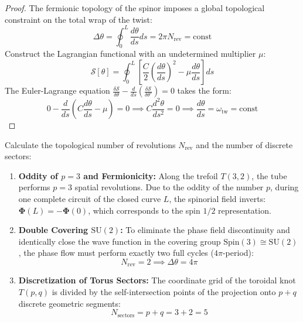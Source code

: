 \documentclass[12pt,a4paper]{article}
\begin{document}
	\begin{proof}
		The fermionic topology of the spinor imposes a global topological constraint on the total wrap of the twist:
		\begin{equation}
			\Delta \theta = \oint_0^L \frac{d\theta}{ds} ds = 2\pi N_{\text{rev}} = \text{const}
		\end{equation}
		Construct the Lagrangian functional with an undetermined multiplier $\mu$:
		\begin{equation}
			\mathcal{S}[\theta] = \oint_0^L \left[ \frac{C}{2} \left(\frac{d\theta}{ds}\right)^2 - \mu \frac{d\theta}{ds} \right] ds
		\end{equation}
		The Euler-Lagrange equation $\frac{\delta \mathcal{S}}{\delta \theta} - \frac{d}{ds}\left(\frac{\delta \mathcal{S}}{\delta \theta'}\right) = 0$ takes the form:
		\begin{equation}
			0 - \frac{d}{ds} \left( C \frac{d\theta}{ds} - \mu \right) = 0 \implies C \frac{d^2\theta}{ds^2} = 0 \implies \frac{d\theta}{ds} = \omega_{\text{tw}} = \text{const}
		\end{equation}
	\end{proof}
	
	Calculate the topological number of revolutions $N_{\text{rev}}$ and the number of discrete sectors:
	\begin{enumerate}
		\item \textbf{Oddity of $p=3$ and Fermionicity:} Along the trefoil $T(3,2)$, the tube performs $p=3$ spatial revolutions. Due to the oddity of the number $p$, during one complete circuit of the closed curve $L$, the spinorial field inverts: $\boldsymbol{\Phi}(L) = -\boldsymbol{\Phi}(0)$, which corresponds to the spin $1/2$ representation.
		\item \textbf{Double Covering $\mathrm{SU}(2)$:} To eliminate the phase field discontinuity and identically close the wave function in the covering group $\mathrm{Spin}(3) \cong \mathrm{SU}(2)$, the phase flow must perform exactly two full cycles ($4\pi$-period):
		\begin{equation}
			N_{\text{rev}} = 2 \implies \Delta \theta = 4\pi
		\end{equation}
		\item \textbf{Discretization of Torus Sectors:} The coordinate grid of the toroidal knot $T(p,q)$ is divided by the self-intersection points of the projection onto $p+q$ discrete geometric segments:
		\begin{equation}
			N_{\text{sectors}} = p + q = 3 + 2 = 5
		\end{equation}
	\end{enumerate}
	
\end{document}
